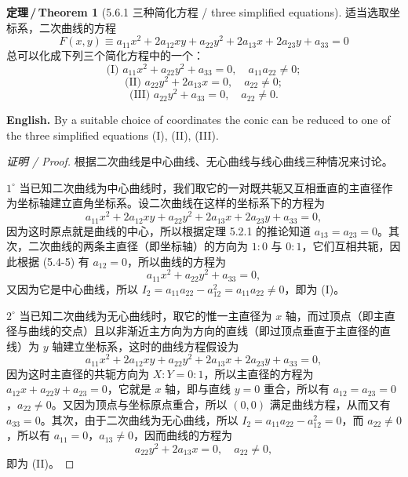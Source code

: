 \documentclass[UTF8,11pt,a4paper]{ctexart}
\newcommand{\EN}[1]{\par\noindent \textbf{English.} #1\par}
\theoremstyle{definition}
\newtheorem*{theorem}{定理\,/\,Theorem}
\begin{document}
\begin{theorem}[5.6.1 三种简化方程 / three simplified equations]\label{thm:simplified}
适当选取坐标系，二次曲线的方程
\[
F(x,y)\equiv a_{11}x^2+2a_{12}xy+a_{22}y^2+2a_{13}x+2a_{23}y+a_{33}=0
\]
总可以化成下列三个简化方程中的一个：
\[
\text{(I) }a_{11}x^2+a_{22}y^2+a_{33}=0,\quad a_{11}a_{22}\ne0;
\]
\[
\text{(II) }a_{22}y^2+2a_{13}x=0,\quad a_{22}\ne0;
\]
\[
\text{(III) }a_{22}y^2+a_{33}=0,\quad a_{22}\ne0.
\]
\EN{By a suitable choice of coordinates the conic can be reduced to one of the three simplified equations (I), (II), (III).}
\end{theorem}

\begin{proof}[证明 / Proof]
根据二次曲线是中心曲线、无心曲线与线心曲线三种情况来讨论。

$1^\circ$ 当已知二次曲线为中心曲线时，我们取它的一对既共轭又互相垂直的主直径作为坐标轴建立直角坐标系。设二次曲线在这样的坐标系下的方程为
\[
a_{11}x^2+2a_{12}xy+a_{22}y^2+2a_{13}x+2a_{23}y+a_{33}=0,
\]
因为这时原点就是曲线的中心，所以根据定理 5.2.1 的推论知道 $a_{13}=a_{23}=0$。其次，二次曲线的两条主直径（即坐标轴）的方向为 $1:0$ 与 $0:1$，它们互相共轭，因此根据 (5.4-5) 有 $a_{12}=0$，所以曲线的方程为
\[
a_{11}x^2+a_{22}y^2+a_{33}=0,
\]
又因为它是中心曲线，所以 $I_2=a_{11}a_{22}-a_{12}^2=a_{11}a_{22}\ne0$，即为 (I)。

$2^\circ$ 当已知二次曲线为无心曲线时，取它的惟一主直径为 $x$ 轴，而过顶点（即主直径与曲线的交点）且以非渐近主方向为方向的直线（即过顶点垂直于主直径的直线）为 $y$ 轴建立坐标系，这时的曲线方程假设为
\[
a_{11}x^2+2a_{12}xy+a_{22}y^2+2a_{13}x+2a_{23}y+a_{33}=0,
\]
因为这时主直径的共轭方向为 $X:Y=0:1$，所以主直径的方程为 $a_{12}x+a_{22}y+a_{23}=0$，它就是 $x$ 轴，即与直线 $y=0$ 重合，所以有 $a_{12}=a_{23}=0$，$a_{22}\ne0$。又因为顶点与坐标原点重合，所以 $(0,0)$ 满足曲线方程，从而又有 $a_{33}=0$。其次，由于二次曲线为无心曲线，所以 $I_2=a_{11}a_{22}-a_{12}^2=0$，而 $a_{22}\ne0$，所以有 $a_{11}=0$，$a_{13}\ne0$，因而曲线的方程为
\[
a_{22}y^2+2a_{13}x=0,\quad a_{22}\ne0,
\]
即为 (II)。


\end{proof}
\end{document}
